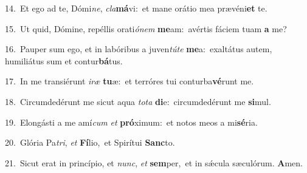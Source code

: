 {\numbfont\textcolor{\numbcolor}{14.}}~Et ego ad te, Dómi\-\textit{ne}\-, \textit{cla}\-\textbf{má}vi:~\star et mane orátio mea prævéni\textbf{et} te.\par
{\numbfont\textcolor{\numbcolor}{15.}}~Ut quid, Dómine, repéllis orati\-\textit{ó}\-\textit{nem} \textbf{me}\-am:~\star avértis fáciem tuam \textbf{a} me?\par
{\numbfont\textcolor{\numbcolor}{16.}}~Pauper sum ego, et in labóribus a juven\-\textit{tú}\-\textit{te} \textbf{me}\-a:~\star exaltátus autem, humiliátus sum et contur\-\textbf{bá}\-tus.\par
{\numbfont\textcolor{\numbcolor}{17.}}~In me transiérunt \textit{i}\-\textit{ræ} \textbf{tu}\-æ:~\star et terróres tui conturba\-\textbf{vé}\-runt me.\par
{\numbfont\textcolor{\numbcolor}{18.}}~Circumdedérunt me sicut aqua \textit{to}\-\textit{ta} \textbf{di}\-e:~\star circumdedérunt me \textbf{si}\-mul.\par
{\numbfont\textcolor{\numbcolor}{19.}}~Elongásti a me amí\textit{cum} \textit{et} \textbf{pró}\-ximum:~\star et notos meos a mi\-\textbf{sé}\-ria.\par
{\numbfont\textcolor{\numbcolor}{20.}}~Glória Pa\-\textit{tri}\-, \textit{et} \textbf{Fí}\-lio,~\star et Spirítui \textbf{Sanc}\-to.\par
{\numbfont\textcolor{\numbcolor}{21.}}~Sicut erat in princípio, et \textit{nunc}\-, \textit{et} \textbf{sem}\-per,~\star et in sǽcula sæculórum. \textbf{A}\-men.\par
